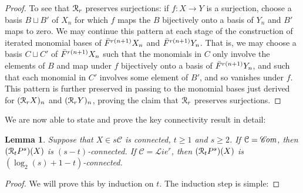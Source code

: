 \documentclass[11pt]{amsart} \renewcommand{\baselinestretch}{1.2}
\theoremstyle{plain}
\newtheorem{lem}[thm]{Lemma}
\numberwithin{equation}{section} %
\theoremstyle{plain}
\newtheorem{lem}[thm]{Lemma}
\numberwithin{equation}{chapter} %
\renewcommand{\to}{\longrightarrow}
\newcommand{\scrL}{\mathscr{L}}
\newcommand{\scrC}{\mathscr{C}}
\newcommand{\calR}{\mathcal{R}}
\newcommand{\calc}{\mathcal{C}}
\newcommand{\algs}{{\scrC\!\textit{\normalfont\textit{om}}}}
\newcommand{\restliealgs}{{\scrL\!\textit{ie}^\textit{r}}}
\newcommand{\algcat}{{\calc}}%
\newcommand{\caldup}[1]{\calR_{\smash{#1}}}
\newcommand{\barConstructionMightAbbreviate}{b}
\begin{document}
\begin{Bousfield-Kan spectral sequence}
\begin{proof}
To see that $\caldup{r}$ preserves surjections: if $f:X\to Y$ is a surjection, choose a basis $B\sqcup B'$ of $X_n$ for  which $f$ maps the $B$ bijectively onto a basis of $Y_n$ and $B'$ maps to zero. We may continue this pattern at each stage of the construction of iterated monomial bases of $\smash{\bar{F}}^{r(n+1)}X_n$ and $\smash{\bar{F}}^{r(n+1)}Y_n$. That is, we may choose a  basis $C\sqcup C'$ of $\smash{\bar{F}}^{r(n+1)}X_n$  such that the monomials in $C$ only involve the elements of $B$ and map under $f$ bijectively onto a basis of $\smash{\bar{F}}^{r(n+1)}Y_n$, and such that each monomial in $C'$ involves some element of $B'$, and so vanishes under $f$. This pattern is further preserved in passing to the monomial bases just derived for $(\caldup{r}X)_n$ and $(\caldup{r}Y)_n$, proving the claim that $\caldup{r}$ preserves surjections. 
%
%
\end{proof}
We are now able to state and prove the key connectivity result in detail:
\begin{lem}
\label{connectivityOfDerivedPowers}
Suppose that $X\in s\algcat$ is connected, $t\geq1$ and $s\geq2$. If $\algcat=\algs$, then $(\caldup{t}P^{s})(X)$ is $(s-t)$-connected. If $\algcat=\restliealgs$, then $(\caldup{t}P^{s})(X)$ is  $(\log_2(s)+1-t)$-connected.
\end{lem}
\begin{proof}
We will prove this by induction on $t$. The induction step is simple: %

\end{proof}
\end{Bousfield-Kan spectral sequence}
\end{document}
